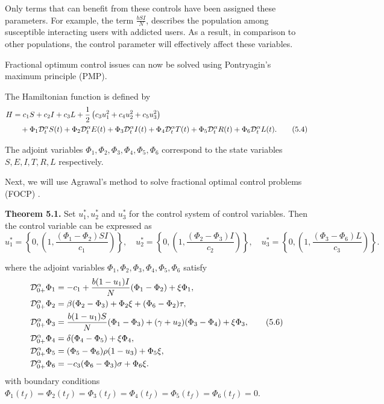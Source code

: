 \documentclass[10pt]{NSP1}
\newcommand{\CD}{\mathcal{D}}
\begin{document}
	Only terms that can benefit from these controls have been assigned these parameters. For example, the term $\frac{b S I}{N}$, describes the population among susceptible interacting users with addicted users. As a result, in comparison to other populations, the control parameter will effectively affect these variables.
	
	Fractional optimum control issues can now be solved using Pontryagin's maximum principle (PMP).
	
	The Hamiltonian function is defined by
	\begin{align}
		H &= c_1 S + c_2 I + c_3 L + \frac{1}{2} \left( c_3 u_1^2 + c_4 u_2^2 + c_5 u_3^2 \right) \notag \\
		&\quad + \Phi_1 \CD_t^\alpha S(t) + \Phi_2 \CD_t^\alpha E(t) + \Phi_3 \CD_t^\alpha I(t) + \Phi_4 \CD_t^\alpha T(t) + \Phi_5 \CD_t^\alpha R(t) + \Phi_6 \CD_t^\alpha L(t).
		\tag{5.4}
	\end{align}
	
	The adjoint variables $\Phi_1, \Phi_2, \Phi_3, \Phi_4, \Phi_5, \Phi_6$ correspond to the state variables $S, E, I, T, R, L$ respectively.
	
	Next, we will use Agrawal's method to solve fractional optimal control problems (FOCP) \cite{ref38}.
	
	\textbf{Theorem 5.1.} Set $u_1^\ast, u_2^\ast$ and $u_3^\ast$ for the control system of control variables. Then the control variable can be expressed as
	\begin{equation}
		u_1^\ast = \left\{ 0, \left( 1, \frac{(\Phi_1 - \Phi_2) S I}{c_1} \right) \right\}, \quad
		u_2^\ast = \left\{ 0, \left( 1, \frac{(\Phi_2 - \Phi_3) I}{c_2} \right) \right\}, \quad
		u_3^\ast = \left\{ 0, \left( 1, \frac{(\Phi_3 - \Phi_6) L}{c_3} \right) \right\}.
		\tag{5.5}
	\end{equation}
	
	where the adjoint variables $\Phi_1, \Phi_2, \Phi_3, \Phi_4, \Phi_5, \Phi_6$ satisfy
	\begin{align}
		\CD_{0+}^{\alpha} \Phi_1 &= -c_1 + \frac{b (1-u_1) I}{N} (\Phi_1 - \Phi_2) + \xi \Phi_1, \notag \\
		\CD_{0+}^{\alpha} \Phi_2 &= \beta(\Phi_2 - \Phi_3) + \Phi_2 \xi + (\Phi_6 - \Phi_2) \tau, \notag \\
		\CD_{0+}^{\alpha} \Phi_3 &= \frac{b (1-u_1) S}{N} (\Phi_1 - \Phi_3) + (\gamma + u_2)(\Phi_3 - \Phi_4) + \xi \Phi_3, \tag{5.6} \\
		\CD_{0+}^{\alpha} \Phi_4 &= \delta(\Phi_4 - \Phi_5) + \xi \Phi_4, \notag \\
		\CD_{0+}^{\alpha} \Phi_5 &= (\Phi_5 - \Phi_6) \rho (1-u_3) + \Phi_5 \xi, \notag \\
		\CD_{0+}^{\alpha} \Phi_6 &= -c_3 (\Phi_6 - \Phi_3) \sigma + \Phi_6 \xi. \notag
	\end{align}
	with boundary conditions $\Phi_1(t_f) = \Phi_2(t_f) = \Phi_3(t_f) = \Phi_4(t_f) = \Phi_5(t_f) = \Phi_6(t_f) = 0$.
	
\end{document}
